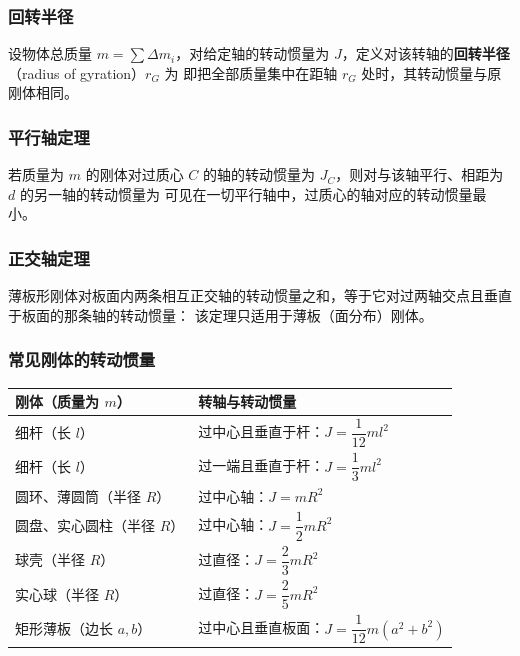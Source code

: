         \subsubsection{回转半径}
        设物体总质量 $m=\sum\Delta m_{i}$，对给定轴的转动惯量为 $J$，定义对该转轴的\textbf{回转半径}（radius of gyration）$r_{G}$ 为
        即把全部质量集中在距轴 $r_{G}$ 处时，其转动惯量与原刚体相同。

        \subsubsection{平行轴定理}
        若质量为 $m$ 的刚体对过质心 $C$ 的轴的转动惯量为 $J_{C}$，则对与该轴平行、相距为 $d$ 的另一轴的转动惯量为
        可见在一切平行轴中，过质心的轴对应的转动惯量最小。

        \subsubsection{正交轴定理}
        薄板形刚体对板面内两条相互正交轴的转动惯量之和，等于它对过两轴交点且垂直于板面的那条轴的转动惯量：
        该定理只适用于薄板（面分布）刚体。

        \subsubsection{常见刚体的转动惯量}
        \begin{center}
        \begin{tabular}{ll}
        \toprule
        刚体（质量为 $m$） & 转轴与转动惯量 \\
        \midrule
        细杆（长 $l$） & 过中心且垂直于杆：$J=\dfrac{1}{12}ml^{2}$ \\
        细杆（长 $l$） & 过一端且垂直于杆：$J=\dfrac{1}{3}ml^{2}$ \\
        圆环、薄圆筒（半径 $R$） & 过中心轴：$J=mR^{2}$ \\
        圆盘、实心圆柱（半径 $R$） & 过中心轴：$J=\dfrac{1}{2}mR^{2}$ \\
        球壳（半径 $R$） & 过直径：$J=\dfrac{2}{3}mR^{2}$ \\
        实心球（半径 $R$） & 过直径：$J=\dfrac{2}{5}mR^{2}$ \\
        矩形薄板（边长 $a,b$） & 过中心且垂直板面：$J=\dfrac{1}{12}m(a^{2}+b^{2})$ \\
        \bottomrule
        \end{tabular}
        \end{center}


